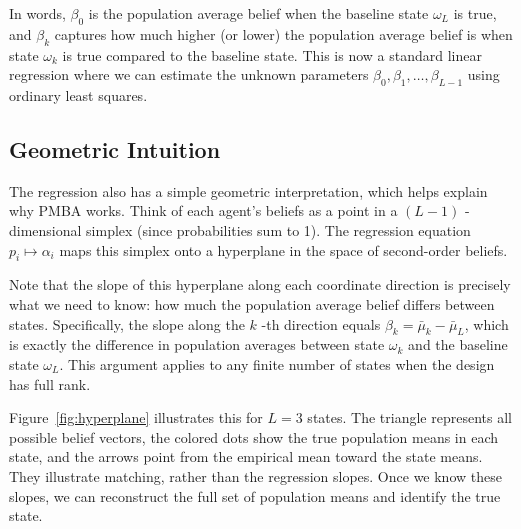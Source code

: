 \documentclass[12pt,reqno]{amsart}
\begin{document}
 In words, $\beta_0$ is the population average belief when the
baseline state $\omega_L$ is true, and $\beta_k$ captures how much higher
(or lower) the population average belief is when state $\omega_k$ is true
compared to the baseline state. This is now a standard linear regression
where we can estimate the unknown parameters $\beta_0, \beta_1, \ldots,
\beta_{L-1}$ using ordinary least squares.

\subsection{Geometric Intuition}

 The regression also has a simple geometric interpretation, which helps explain why PMBA works. Think of each agent's beliefs as a point in a $(L-1)$%
-dimensional simplex (since probabilities sum to 1). The regression equation
$p_i\mapsto\alpha_i$ maps this simplex onto a hyperplane in the space of
second-order beliefs.

 Note that the slope of this hyperplane along each coordinate direction is precisely what we need to know: how much the population
average belief differs between states. Specifically, the slope along the $k$%
-th direction equals $\beta_k = \bar\mu_k - \bar\mu_L$, which is exactly the
difference in population averages between state $\omega_k$ and the baseline
state $\omega_L$. This argument applies to any finite number of states when
the design has full rank.

Figure~\ref{fig:hyperplane} illustrates this for $L=3$ states. The triangle
represents all possible belief vectors, the colored dots show the true
population means in each state, and the arrows point from the empirical mean
toward the state means. They illustrate matching, rather than the regression
slopes. Once we know these slopes, we can reconstruct the full set of
population means and identify the true state.
\end{document}
